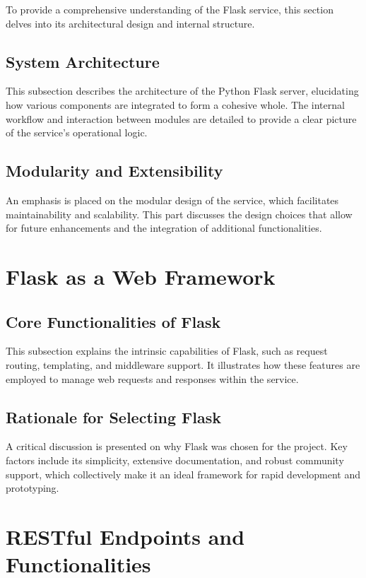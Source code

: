 To provide a comprehensive understanding of the Flask service, this section delves into its architectural design and internal structure.

\subsection{System Architecture}

This subsection describes the architecture of the Python Flask server, elucidating how various components are integrated to form a cohesive whole. The internal workflow and interaction between modules are detailed to provide a clear picture of the service's operational logic.

\subsection{Modularity and Extensibility}

An emphasis is placed on the modular design of the service, which facilitates maintainability and scalability. This part discusses the design choices that allow for future enhancements and the integration of additional functionalities.

\section{Flask as a Web Framework}

\subsection{Core Functionalities of Flask}
This subsection explains the intrinsic capabilities of Flask, such as request routing, templating, and middleware support. It illustrates how these features are employed to manage web requests and responses within the service.

\subsection{Rationale for Selecting Flask}
A critical discussion is presented on why Flask was chosen for the project. Key factors include its simplicity, extensive documentation, and robust community support, which collectively make it an ideal framework for rapid development and prototyping.

\section{RESTful Endpoints and Functionalities}
\label{sec:endpoints}
